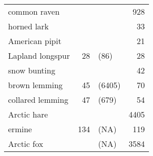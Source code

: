\begin{table}[ht]
\begin{tabularx}{0.6\textwidth}{lrlr}
  common raven &  &  & 928 \\ 
  horned lark &  &  & 33 \\ 
  American pipit &  &  & 21 \\ 
  Lapland longspur & 28 & (86) & 28 \\ 
  snow bunting &  &  & 42 \\ 
  brown lemming & 45 & (6405) & 70 \\ 
  collared lemming & 47 & (679) & 54 \\ 
  Arctic hare &  &  & 4405 \\ 
  ermine & 134 & (NA) & 119 \\ 
  Arctic fox &  & (NA) & 3584 \\ 
   \hline
\end{tabularx}
\endgroup
\end{table}
